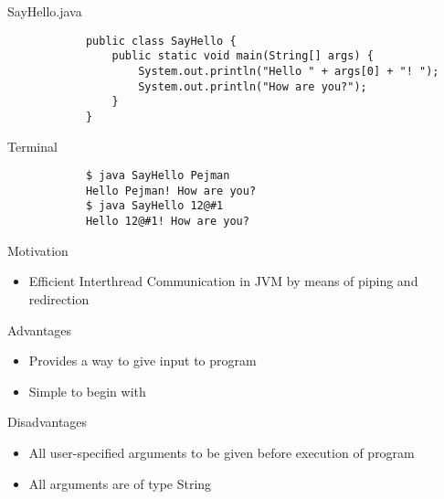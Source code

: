 \documentclass[10pt, compress]{beamer}
\begin{document}
\begin{slide}
	\begin{block}{SayHello.java}
		\begin{verbatim}
			public class SayHello {
			    public static void main(String[] args) {
			        System.out.println("Hello " + args[0] + "! ");
			        System.out.println("How are you?");
			    }
			}
		\end{verbatim}
	\end{block}
	\begin{block}{Terminal}
		\begin{verbatim}
			$ java SayHello Pejman
			Hello Pejman! How are you?
			$ java SayHello 12@#1
			Hello 12@#1! How are you?
		\end{verbatim}
	\end{block}
\end{slide}

\begin{slide}
	\begin{block}{Motivation}
		\begin{itemize}
			\item[] Efficient Interthread Communication in JVM by means of piping and redirection
		\end{itemize}
	\end{block}
	\begin{block}{Advantages}
		\begin{itemize}
			\item[] Provides a way to give input to program
			\item[] Simple to begin with
		\end{itemize}
	\end{block}
	\begin{block}{Disadvantages}
		\begin{itemize}
			\item[] All user-specified arguments to be given before execution of program
			\item[] All arguments are of type String
		\end{itemize}
	\end{block}
\end{slide}

\end{document}
